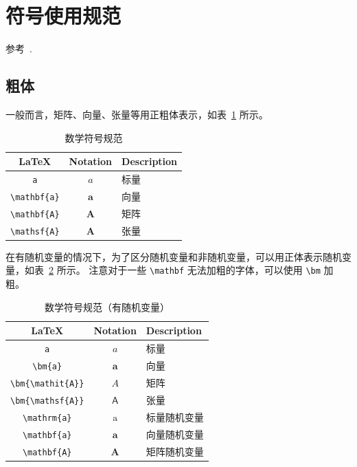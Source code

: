 \documentclass[11pt,a4paper,UTF8]{ctexart}
\begin{document}
%     

\newpage
\section{符号使用规范}
参考~\cite{downes2017short,ZhangHao2017}.

\subsection{粗体}
一般而言，矩阵、向量、张量等用正粗体表示，如表~\ref{tab:math1} 所示。
\begin{table}[htbp]
    \centering
    \begin{tabular}{c c l}
        \toprule
        \LaTeX & Notation & Description   \\
        \midrule 
        \verb|a| & $a$ & 标量\\ 
        \verb|\mathbf{a}| & $\mathbf{a}$ & 向量 \\
        \verb|\mathbf{A}| & $\mathbf{A}$ & 矩阵 \\
        \verb|\mathsf{A}| & $\mathbf{A}$ & 张量 \\\bottomrule
    \end{tabular}
    \caption{数学符号规范}
    \label{tab:math1}
\end{table}

在有随机变量的情况下，为了区分随机变量和非随机变量，可以用正体表示随机变量，如表~\ref{tab:math2} 所示。
注意对于一些 \verb|\mathbf| 无法加粗的字体，可以使用 \verb|\bm| 加粗。

\begin{table}[htbp]
    \centering
    \begin{tabular}{c c l}
        \toprule
        \LaTeX & Notation & Description   \\
        \midrule 
        \verb|a| & $a$ & 标量 \\ 
        \verb|\bm{a}| & $\bm{a}$ & 向量 \\
        \verb|\bm{\mathit{A}}| & $\bm{\mathit{A}}$ & 矩阵 \\
        \verb|\bm{\mathsf{A}}| & $\bm{\mathsf{A}} $ & 张量 \\
        \verb|\mathrm{a}| & $\mathrm{a}$ & 标量随机变量 \\
        \verb|\mathbf{a}| & $\mathbf{a}$ & 向量随机变量 \\
        \verb|\mathbf{A}| & $\mathbf{A}$ & 矩阵随机变量 \\\bottomrule
    \end{tabular}
    \caption{数学符号规范（有随机变量）}
    \label{tab:math2}
\end{table}
 
\end{document}
